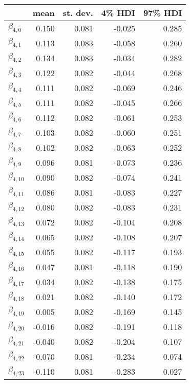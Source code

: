 \begin{tabular}{lrrrr}
\toprule
{} &   mean &  st. dev. &  4\% HDI &  97\% HDI \\
\midrule
$\beta_{4,0}$  &  0.150 &     0.081 &   -0.025 &     0.285 \\
$\beta_{4,1}$  &  0.113 &     0.083 &   -0.058 &     0.260 \\
$\beta_{4,2}$  &  0.134 &     0.083 &   -0.034 &     0.282 \\
$\beta_{4,3}$  &  0.122 &     0.082 &   -0.044 &     0.268 \\
$\beta_{4,4}$  &  0.111 &     0.082 &   -0.069 &     0.246 \\
$\beta_{4,5}$  &  0.111 &     0.082 &   -0.045 &     0.266 \\
$\beta_{4,6}$  &  0.112 &     0.082 &   -0.061 &     0.253 \\
$\beta_{4,7}$  &  0.103 &     0.082 &   -0.060 &     0.251 \\
$\beta_{4,8}$  &  0.102 &     0.082 &   -0.063 &     0.252 \\
$\beta_{4,9}$  &  0.096 &     0.081 &   -0.073 &     0.236 \\
$\beta_{4,10}$ &  0.090 &     0.082 &   -0.074 &     0.241 \\
$\beta_{4,11}$ &  0.086 &     0.081 &   -0.083 &     0.227 \\
$\beta_{4,12}$ &  0.080 &     0.082 &   -0.083 &     0.231 \\
$\beta_{4,13}$ &  0.072 &     0.082 &   -0.104 &     0.208 \\
$\beta_{4,14}$ &  0.065 &     0.082 &   -0.108 &     0.207 \\
$\beta_{4,15}$ &  0.055 &     0.082 &   -0.117 &     0.193 \\
$\beta_{4,16}$ &  0.047 &     0.081 &   -0.118 &     0.190 \\
$\beta_{4,17}$ &  0.034 &     0.082 &   -0.138 &     0.175 \\
$\beta_{4,18}$ &  0.021 &     0.082 &   -0.140 &     0.172 \\
$\beta_{4,19}$ &  0.005 &     0.082 &   -0.169 &     0.145 \\
$\beta_{4,20}$ & -0.016 &     0.082 &   -0.191 &     0.118 \\
$\beta_{4,21}$ & -0.040 &     0.082 &   -0.204 &     0.107 \\
$\beta_{4,22}$ & -0.070 &     0.081 &   -0.234 &     0.074 \\
$\beta_{4,23}$ & -0.110 &     0.081 &   -0.283 &     0.027 \\

\end{tabular}

